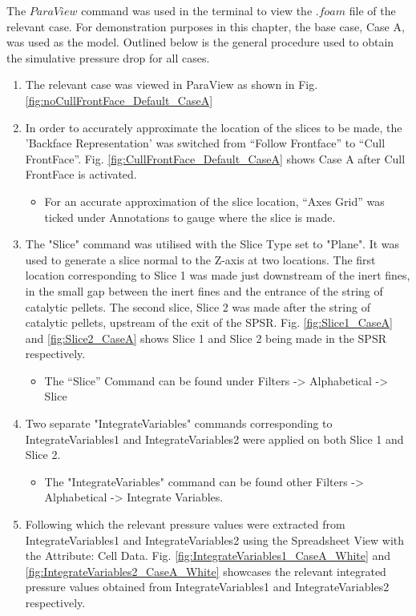 The $ParaView$ command was used in the terminal to view the $.foam$ file of the relevant case. For demonstration purposes in this chapter, the base case, Case A, was used as the model. Outlined below is the general procedure used to obtain the simulative pressure drop for all cases.
\begin{enumerate}
	\item The relevant case was viewed in ParaView as shown in Fig. \ref{fig:noCullFrontFace_Default_CaseA}
	\item In order to accurately approximate the location of the slices to be made, the 'Backface Representation' was switched from “Follow Frontface” to “Cull FrontFace”. Fig. \ref{fig:CullFrontFace_Default_CaseA} shows Case A after Cull FrontFace is activated.
		\begin{itemize}
			\item For an accurate approximation of the slice location, “Axes Grid” was ticked under Annotations to gauge where the slice is made.
		\end{itemize}
	\item The "Slice" command was utilised with the Slice Type set to "Plane". It was used to generate a slice normal to the Z-axis at two locations. The first location corresponding to Slice 1 was made just downstream of the inert fines, in the small gap between the inert fines and the entrance of the string of catalytic pellets. The second slice, Slice 2 was made after the string of catalytic pellets, upstream of the exit of the SPSR. Fig. \ref{fig:Slice1_CaseA} and \ref{fig:Slice2_CaseA} shows Slice 1 and Slice 2 being made in the SPSR respectively.
		\begin{itemize}
			\item The “Slice” Command can be found under Filters -> Alphabetical -> Slice
		\end{itemize}
		\item Two separate "IntegrateVariables" commands corresponding to IntegrateVariables1 and IntegrateVariables2 were applied on both Slice 1 and Slice 2.
		\begin{itemize}
			\item The "IntegrateVariables" command can be found other Filters -> Alphabetical -> Integrate Variables.
		\end{itemize}
	\item Following which the relevant pressure values were extracted from IntegrateVariables1 and IntegrateVariables2 using the Spreadsheet View with the Attribute: Cell Data. Fig. \ref{fig:IntegrateVariables1_CaseA_White} and \ref{fig:IntegrateVariables2_CaseA_White} showcases the relevant integrated pressure values obtained from IntegrateVariables1 and IntegrateVariables2 respectively.
\end{enumerate}
